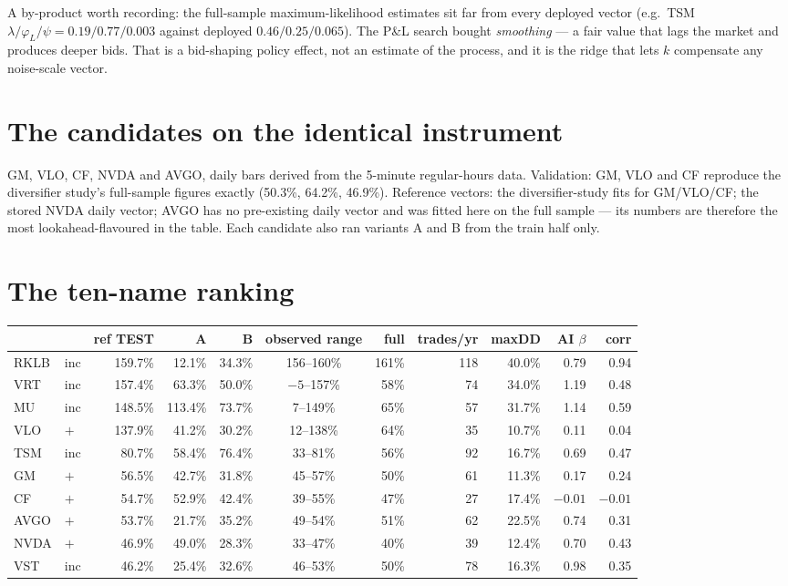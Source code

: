 \documentclass[11pt,a4paper]{article}
\begin{document}
A by-product worth recording: the full-sample maximum-likelihood estimates sit far
from every deployed vector (e.g.\ TSM $\lambda/\varphi_L/\psi = 0.19/0.77/0.003$
against deployed $0.46/0.25/0.065$). The P\&L search bought \emph{smoothing} --- a
fair value that lags the market and produces deeper bids. That is a bid-shaping
policy effect, not an estimate of the process, and it is the ridge that lets $k$
compensate any noise-scale vector.

\section{The candidates on the identical instrument}

GM, VLO, CF, NVDA and AVGO, daily bars derived from the 5-minute regular-hours
data. Validation: GM, VLO and CF reproduce the diversifier study's full-sample
figures exactly (50.3\%, 64.2\%, 46.9\%). Reference vectors: the diversifier-study
fits for GM/VLO/CF; the stored NVDA daily vector; AVGO has no pre-existing daily
vector and was fitted here on the full sample --- its numbers are therefore the
most lookahead-flavoured in the table. Each candidate also ran variants A and B
from the train half only.

\section{The ten-name ranking}

\begingroup\small
\setlength{\tabcolsep}{4.5pt}
\begin{center}
\begin{tabular}{llrrrcrrrrr}
\toprule
 & & ref TEST & A & B & observed range & full & trades/yr & maxDD & AI $\beta$ & corr \\
\midrule
RKLB & inc & 159.7\% & 12.1\% & 34.3\% & 156--160\% & 161\% & 118 & 40.0\% & 0.79 & 0.94 \\
VRT  & inc & 157.4\% & 63.3\% & 50.0\% & $-5$--157\% & 58\% & 74 & 34.0\% & 1.19 & 0.48 \\
MU   & inc & 148.5\% & 113.4\% & 73.7\% & 7--149\% & 65\% & 57 & 31.7\% & 1.14 & 0.59 \\
VLO  & $+$ & 137.9\% & 41.2\% & 30.2\% & 12--138\% & 64\% & 35 & 10.7\% & 0.11 & 0.04 \\
TSM  & inc &  80.7\% & 58.4\% & 76.4\% & 33--81\% & 56\% & 92 & 16.7\% & 0.69 & 0.47 \\
GM   & $+$ &  56.5\% & 42.7\% & 31.8\% & 45--57\% & 50\% & 61 & 11.3\% & 0.17 & 0.24 \\
CF   & $+$ &  54.7\% & 52.9\% & 42.4\% & 39--55\% & 47\% & 27 & 17.4\% & $-0.01$ & $-0.01$ \\
AVGO & $+$ &  53.7\% & 21.7\% & 35.2\% & 49--54\% & 51\% & 62 & 22.5\% & 0.74 & 0.31 \\
NVDA & $+$ &  46.9\% & 49.0\% & 28.3\% & 33--47\% & 40\% & 39 & 12.4\% & 0.70 & 0.43 \\
VST  & inc &  46.2\% & 25.4\% & 32.6\% & 46--53\% & 50\% & 78 & 16.3\% & 0.98 & 0.35 \\
\bottomrule
\end{tabular}
\end{center}
\endgroup
\end{document}
